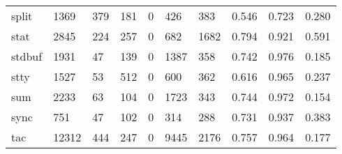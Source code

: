 \begin{longtable}{lp{1.3cm}p{1.3cm}p{1.3cm}p{1.3cm}p{1.3cm}p{1.3cm}p{1.3cm}p{1.3cm}p{1.3cm}}
split     &                   1369 &                                379 &                               181 &                                0 &                               426 &                             383 &                                0.546 &                                  0.723 &                                0.280 \\
stat      &                   2845 &                                224 &                               257 &                                0 &                               682 &                            1682 &                                0.794 &                                  0.921 &                                0.591 \\
stdbuf    &                   1931 &                                 47 &                               139 &                                0 &                              1387 &                             358 &                                0.742 &                                  0.976 &                                0.185 \\
stty      &                   1527 &                                 53 &                               512 &                                0 &                               600 &                             362 &                                0.616 &                                  0.965 &                                0.237 \\
sum       &                   2233 &                                 63 &                               104 &                                0 &                              1723 &                             343 &                                0.744 &                                  0.972 &                                0.154 \\
sync      &                    751 &                                 47 &                               102 &                                0 &                               314 &                             288 &                                0.731 &                                  0.937 &                                0.383 \\
tac       &                  12312 &                                444 &                               247 &                                0 &                              9445 &                            2176 &                                0.757 &                                  0.964 &                                0.177 \\

\end{longtable}
